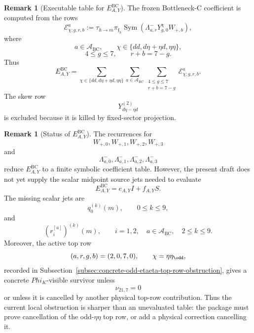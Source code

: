 \documentclass[11pt,a4paper]{amsart}
\def\Phi{Phi}%
\theoremstyle{plain}
\theoremstyle{definition}
\newtheorem{remark}[theorem]{Remark}
\begin{document}
\begin{remark}[Executable table for \(E_{A,Y}^{\mathrm{BC}}\)]
\label{rem:executable-table-eay-bc}
The frozen Bottleneck-C coefficient is computed from the rows
\[
\mathcal E^a_{\chi;g,r,b}
:=
\tau_{h\to m}\pi_{\mathfrak f_h}
\operatorname{Sym}
\left(
\Lambda^-_{a,r}
Y^\chi_{g,0}
W_{+,b}
\right),
\]
where
\[
a\in\mathcal A_{\mathrm{BC}},
\qquad
\chi\in\{dd,d\eta+\eta d,\eta\eta\},
\]
\[
4\le g\le7,\qquad r+b=7-g.
\]
Thus
\[
E_{A,Y}^{\mathrm{BC}}
=
\sum_{\chi\in\{dd,d\eta+\eta d,\eta\eta\}}
\sum_{a\in\mathcal A_{\mathrm{BC}}}
\sum_{\substack{4\le g\le7\\ r+b=7-g}}
\mathcal E^a_{\chi;g,r,b}.
\]
The skew row
\[
Y_{d\eta-\eta d}^{(2)}
\]
is excluded because it is killed by fixed-sector projection.
\end{remark}

\begin{remark}[Status of \(E_{A,Y}^{\mathrm{BC}}\)]
\label{rem:status-eay-bc}
The recurrences for
\[
W_{+,0},W_{+,1},W_{+,2},W_{+,3}
\]
and
\[
\Lambda^-_{a,0},\Lambda^-_{a,1},\Lambda^-_{a,2},\Lambda^-_{a,3}
\]
reduce \(E_{A,Y}^{\mathrm{BC}}\) to a finite symbolic coefficient table.
However, the present draft does not yet supply the scalar midpoint source
jets needed to evaluate
\[
E_{A,Y}^{\mathrm{BC}}=e_{A,Y}I+f_{A,Y}S.
\]
The missing scalar jets are
\[
q_0^{(k)}(m),\qquad 0\le k\le9,
\]
and
\[
(r_i^{[a]})^{(k)}(m),
\qquad
i=1,2,\quad a\in\mathcal A_{\mathrm{BC}},\quad 2\le k\le9.
\]
Moreover, the active top row
\[
(a,r,g,b)=(2,0,7,0),\qquad \chi=\eta\eta_{\odd},
\]
recorded in
Subsection~\ref{subsec:concrete-odd-etaeta-top-row-obstruction}, gives a
concrete \(\Phi_K\)-visible survivor unless
\[
\nu_{21,7}=0
\]
or unless it is cancelled by another physical top-row contribution.  Thus the
current local obstruction is sharper than an unevaluated table: the package
must prove cancellation of the odd-\(\eta\eta\) top row, or add a physical
correction cancelling it.
\end{remark}
\end{document}
